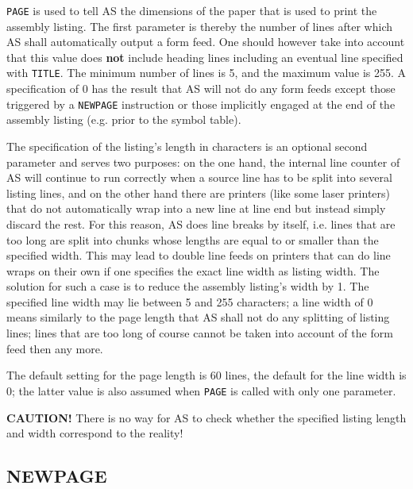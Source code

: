 \documentclass[12pt,twoside]{report}
\makeatletter
\newcommand{\bb}[1]{{\bf #1}}
\newcommand{\tty}[1]{{\tt #1}}
\newcommand{\ttindex}[1]{\index{#1@{\tt #1}}}
\makeatother
\begin{document}
\tty{PAGE} is used to tell AS the dimensions of the paper that is used to
print the assembly listing.  The first parameter is thereby the
number of lines after which AS shall automatically output a form
feed.  One should however take into account that this value does \bb{not}
include heading lines including an eventual line specified with
\tty{TITLE}.  The minimum number of lines is 5, and the maximum value is
255.  A specification of 0 has the result that AS will not do any form
feeds except those triggered by a \tty{NEWPAGE} instruction or those
implicitly engaged at the end of the assembly listing (e.g. prior to the
symbol table).

The specification of the listing's length in characters is an
optional second parameter and serves two purposes: on the one hand,
the internal line counter of AS will continue to run correctly when a
source line has to be split into several listing lines, and on
the other hand there are printers (like some laser printers) that do
not automatically wrap into a new line at line end but instead simply
discard the rest.  For this reason, AS does line breaks by itself,
i.e. lines that are too long are split into chunks whose lengths are
equal to or smaller than the specified width.  This may lead to
double line feeds on printers that can do line wraps on their own if
one specifies the exact line width as listing width.  The solution
for such a case is to reduce the assembly listing's width by 1.  The
specified line width may lie between 5 and 255 characters; a line
width of 0 means similarly to the page length that AS shall not do
any splitting of listing lines; lines that are too long of course
cannot be taken into account of the form feed then any more.

The default setting for the page length is 60 lines, the default for the
line width is 0; the latter value is also assumed when \tty{PAGE} is
called with only one parameter.

\bb{CAUTION!}  There is no way for AS to check whether the specified
listing length and width correspond to the reality!


\subsection{NEWPAGE}
\ttindex{NEWPAGE}
\end{document}
